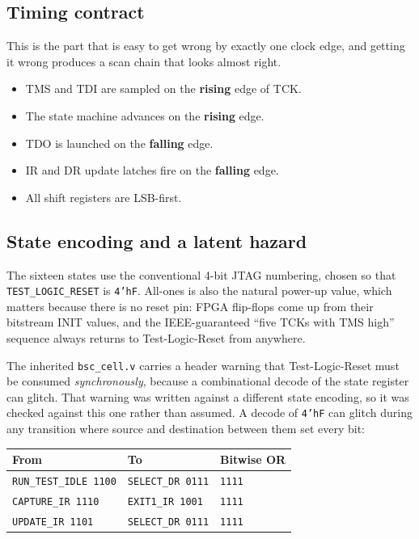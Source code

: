 \documentclass[11pt,a4paper]{article}
\newcommand{\file}[1]{\texttt{#1}}
\begin{document}
\subsection{Timing contract}

This is the part that is easy to get wrong by exactly one clock edge, and
getting it wrong produces a scan chain that looks almost right.

\begin{itemize}[nosep]
  \item TMS and TDI are sampled on the \textbf{rising} edge of TCK.
  \item The state machine advances on the \textbf{rising} edge.
  \item TDO is launched on the \textbf{falling} edge.
  \item IR and DR update latches fire on the \textbf{falling} edge.
  \item All shift registers are LSB-first.
\end{itemize}

\subsection{State encoding and a latent hazard}

The sixteen states use the conventional 4-bit JTAG numbering, chosen so that
\texttt{TEST\_LOGIC\_RESET} is \texttt{4'hF}. All-ones is also the natural
power-up value, which matters because there is no reset pin: FPGA flip-flops
come up from their bitstream INIT values, and the IEEE-guaranteed ``five TCKs
with TMS high'' sequence always returns to Test-Logic-Reset from anywhere.

The inherited \file{bsc\_cell.v} carries a header warning that Test-Logic-Reset
must be consumed \emph{synchronously}, because a combinational decode of the
state register can glitch. That warning was written against a different state
encoding, so it was checked against this one rather than assumed. A decode of
\texttt{4'hF} can glitch during any transition where source and destination
between them set every bit:

\begin{center}
\begin{tabular}{lll}
\toprule
\textbf{From} & \textbf{To} & \textbf{Bitwise OR} \\
\midrule
\texttt{RUN\_TEST\_IDLE 1100} & \texttt{SELECT\_DR 0111} & \texttt{1111} \\
\texttt{CAPTURE\_IR 1110}     & \texttt{EXIT1\_IR 1001}  & \texttt{1111} \\
\texttt{UPDATE\_IR 1101}      & \texttt{SELECT\_DR 0111} & \texttt{1111} \\
\bottomrule
\end{tabular}
\end{center}
\end{document}
